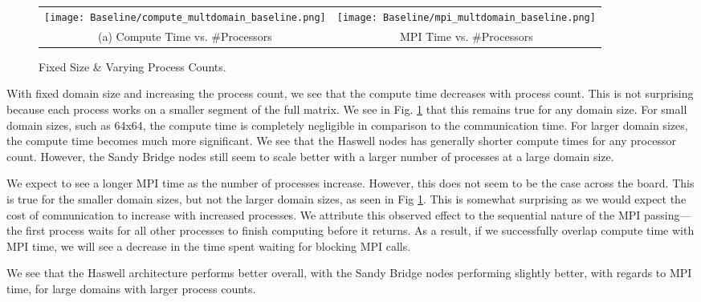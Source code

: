 \begin{enumerate}
	\begin{figure}[h] %
		\hspace*{-0.25\linewidth}\begin{tabular}{cc}
			\texttt{[image: Baseline/compute\_multdomain\_baseline.png]} & \texttt{[image: Baseline/mpi\_multdomain\_baseline.png]} \\
			(a) Compute Time vs. \#Processors & MPI Time vs. \#Processors\\[6pt]
		\end{tabular}
		\caption{Fixed Size \& Varying Process Counts.}
		\label{fig:varying_domain}
	\end{figure}


With fixed domain size and increasing the process count, we see that the compute time decreases with process count. This is not surprising because each process works on a smaller segment of the full matrix. We see in Fig. \ref{fig:varying_domain} that this remains true for any domain size. For small domain sizes, such as 64x64, the compute time is completely negligible in comparison to the communication time. For larger domain sizes, the compute time becomes much more significant. We see that the Haswell nodes has generally shorter compute times for any processor count. However, the Sandy Bridge nodes still seem to scale better with a larger number of processes at a large domain size.

We expect to see a longer MPI time as the number of processes increase. However, this does not seem to be the case across the board. This is true for the smaller domain sizes, but not the larger domain sizes, as seen in Fig \ref{fig:varying_domain}. This is somewhat surprising as we would expect the cost of comnunication to increase with increased processes. We attribute this observed effect to the sequential nature of the MPI passing---the first process waits for all other processes to finish computing before it returns. As a result, if we successfully overlap compute time with MPI time, we will see a decrease in the time spent waiting for blocking MPI calls.

We see that the Haswell architecture performs better overall, with the Sandy Bridge nodes performing slightly better, with regards to MPI time, for large domains with larger process counts.
\end{enumerate}

